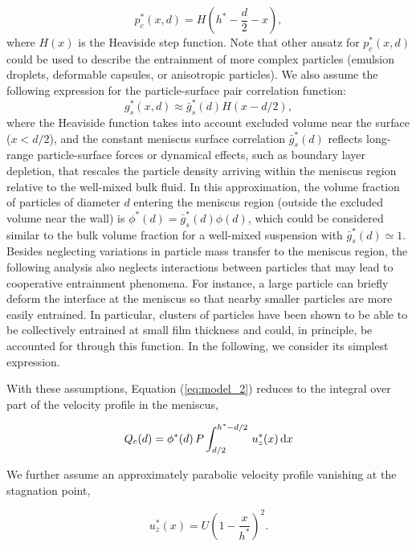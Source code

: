 \documentclass{jfm}
\begin{document}
%
\begin{equation}
    p_{c}^{*}(x, d)=H\left(h^{*}-\frac{d}{2}-x\right),
\end{equation}
%
where $H(x)$ is the Heaviside step function. Note that other ansatz for $p_{c}^{*}(x, d)$ could be used to describe the entrainment of more complex particles (emulsion droplets, deformable capsules, or anisotropic particles). We also assume the following expression for the particle-surface pair correlation function:
%
\begin{equation}
g_{s}^{*}(x, d) \approx \bar{g}_{s}^{*}(d) H(x-d/2),
\end{equation}
%
where the Heaviside function takes into account excluded volume near the surface ($x<d/2$), and the constant meniscus surface correlation $\bar{g}_{s}^{*}(d)$ reflects long-range particle-surface forces or dynamical effects, such as boundary layer depletion, that rescales the particle density arriving within the meniscus region relative to the well-mixed bulk fluid. In this approximation, the volume fraction of particles of diameter $d$ entering the meniscus region (outside the excluded volume near the wall) is $\phi^{*}(d)=\bar{g}_{s}^{*}(d) \phi(d)$, which could be considered similar to the bulk volume fraction for a well-mixed suspension with $\bar{g}_{s}^{*}(d) \simeq 1$. Besides neglecting variations in particle mass transfer to the meniscus region, the following analysis also neglects interactions between particles that may lead to cooperative entrainment phenomena. For instance, a large particle can briefly deform the interface at the meniscus so that nearby smaller particles are more easily entrained. In particular, clusters of particles have been shown to be able to be collectively entrained at small film thickness \cite[][]{colosqui2013hydrodynamically,sauret2019capillary} and could, in principle, be accounted for through this function. In the following, we consider its simplest expression.

With these assumptions, Equation (\ref{eq:model_2}) reduces to the integral over part of the velocity profile in the meniscus,

\begin{equation} \label{eq:Qc}
Q_{c}(d) = \phi^{*}(d) \,P \int_{d/2}^{h^{*}-d/2} \,u_{z}^{*}(x) \,{\rm d} x
\end{equation}

We further assume an approximately parabolic velocity profile vanishing at the stagnation point,

\begin{equation} \label{eq:flow_profile}
u_{z}^{*}(x) = U\left(1-\frac{x}{h^{*}}\right)^2.
\end{equation}
\end{document}
